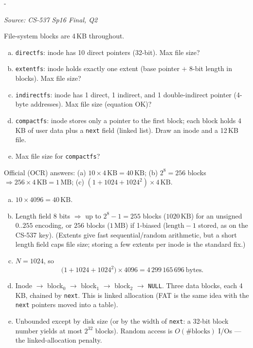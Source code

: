 \documentclass[11pt,a4paper]{article}
\makeatletter
\newcommand{\keepspace}[1]{\par\penalty-100\begingroup
  \setlength{\dimen@}{#1}\dimen@ii\pagegoal\advance\dimen@ii-\pagetotal
  \ifdim\dimen@>\dimen@ii\ifdim\dimen@ii>\z@\vfil\fi\break\fi\endgroup}
\newcounter{qn}[section]
\newenvironment{Qn}[4]{%
  \refstepcounter{qn}\keepspace{7\baselineskip}%
  \begin{tcolorbox}[qboxstyle, title={Q\thesection.\theqn\ \ [#1 \textbar\ #2]\ \ #4}]%
  {\footnotesize\color{g3}\textit{Source: #3}}\par\smallskip%
}{%
  \end{tcolorbox}%
}
\newenvironment{Sol}{%
  \begin{tcolorbox}[sboxstyle, title={Solution}]%
}{%
  \end{tcolorbox}\vspace{0.35em}%
}
\makeatother
\begin{document}
\begin{Qn}{Hard}{Lect 24}{CS-537 Sp16 Final, Q2}{directfs, extentfs, indirectfs, compactfs (linked)}
File-system blocks are 4\,KB throughout.
\begin{enumerate}[(a)]
\item \texttt{directfs}: inode has 10 direct pointers (32-bit). Max file
      size?
\item \texttt{extentfs}: inode holds exactly one extent
      (base pointer $+$ 8-bit length in blocks). Max file size?
\item \texttt{indirectfs}: inode has 1 direct, 1 indirect, and 1
      double-indirect pointer (4-byte addresses). Max file size
      (equation OK)?
\item \texttt{compactfs}: inode stores only a pointer to the first
      block; each block holds 4\,KB of user data plus a \texttt{next}
      field (linked list). Draw an inode and a 12\,KB file.
\item Max file size for \texttt{compactfs}?
\end{enumerate}
\end{Qn}
\begin{Sol}
Official (OCR) answers: (a) $10\times 4\,\mathrm{KB}=40\,\mathrm{KB}$;
(b) $2^{8}=256$ blocks $\Rightarrow 256\times 4\,\mathrm{KB}=1\,\mathrm{MB}$;
(c) $(1+1024+1024^{2})\times 4\,\mathrm{KB}$.
\begin{enumerate}[(a)]
\item $10\times 4096 = 40\,\mathrm{KB}$.
\item Length field 8 bits $\Rightarrow$ up to $2^{8}-1 = 255$ blocks
      ($1020\,\mathrm{KB}$) for an unsigned $0..255$ encoding, or
      $256$ blocks ($1\,\mathrm{MB}$) if 1-biased ($\text{length}-1$
      stored, as on the CS-537 key). (Extents give fast sequential/random
      arithmetic, but a short length field caps file size; storing a few
      extents per inode is the standard fix.)
\item $N=1024$, so
      \[
        \bigl(1 + 1024 + 1024^{2}\bigr)\times 4096
        = 4\,299\,165\,696\ \text{bytes}.
      \]
\item Inode $\to$ block$_0$ $\to$ block$_1$ $\to$ block$_2$ $\to$
      \texttt{NULL}. Three data blocks, each 4\,KB, chained by
      \texttt{next}. This is linked allocation (FAT is the same idea
      with the \texttt{next} pointers moved into a table).
\item Unbounded except by disk size (or by the width of
      \texttt{next}: a 32-bit block number yields at most $2^{32}$
      blocks). Random access is $O(\#\text{blocks})$ I/Os --- the
      linked-allocation penalty.
\end{enumerate}
\end{Sol}
\end{document}
